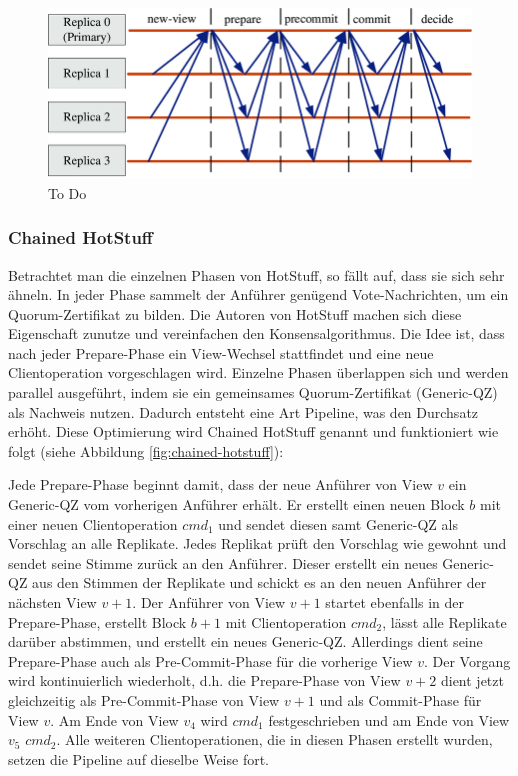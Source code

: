 \documentclass[nonacm,sigconf,natbib=false]{acmart}
\begin{document}
\begin{figure}
  \centering
  \includegraphics[width=\linewidth]{hotstuff.png}
  \caption{To Do}
  \label{fig:hotstuff}
\end{figure}

\subsubsection{Chained HotStuff}

Betrachtet man die einzelnen Phasen von HotStuff, so fällt auf, dass sie sich sehr ähneln. In jeder Phase sammelt der Anführer genügend Vote-Nachrichten, um ein Quorum-Zertifikat zu bilden. Die Autoren von HotStuff machen sich diese Eigenschaft zunutze und vereinfachen den Konsensalgorithmus. Die Idee ist, dass nach jeder Prepare-Phase ein View-Wechsel stattfindet und eine neue Clientoperation vorgeschlagen wird. Einzelne Phasen überlappen sich und werden parallel ausgeführt, indem sie ein gemeinsames Quorum-Zertifikat (Generic-QZ) als Nachweis nutzen. Dadurch entsteht eine Art Pipeline, was den Durchsatz erhöht. Diese Optimierung wird Chained HotStuff genannt und funktioniert wie folgt (siehe Abbildung \ref{fig:chained-hotstuff}):

Jede Prepare-Phase beginnt damit, dass der neue Anführer von View $v$ ein Generic-QZ vom vorherigen Anführer erhält. Er erstellt einen neuen Block $b$ mit einer neuen Clientoperation $cmd_1$ und sendet diesen samt Generic-QZ als Vorschlag an alle Replikate. Jedes Replikat prüft den Vorschlag wie gewohnt und sendet seine Stimme zurück an den Anführer. Dieser erstellt ein neues Generic-QZ aus den Stimmen der Replikate und schickt es an den neuen Anführer der nächsten View $v+1$. Der Anführer von View $v+1$ startet ebenfalls in der Prepare-Phase, erstellt Block $b+1$ mit Clientoperation $cmd_2$, lässt alle Replikate darüber abstimmen, und erstellt ein neues Generic-QZ. Allerdings dient seine Prepare-Phase auch als Pre-Commit-Phase für die vorherige View $v$. Der Vorgang wird kontinuierlich wiederholt, d.h. die Prepare-Phase von View $v+2$ dient jetzt gleichzeitig als Pre-Commit-Phase von View $v+1$ und als Commit-Phase für View $v$. Am Ende von View $v_4$ wird $cmd_1$ festgeschrieben und am Ende von View $v_5$ $cmd_2$. Alle weiteren Clientoperationen, die in diesen Phasen erstellt wurden, setzen die Pipeline auf dieselbe Weise fort.
\end{document}
